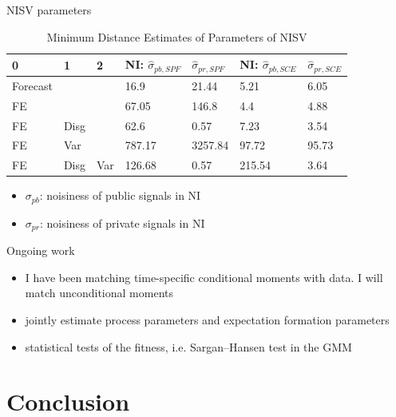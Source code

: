 \documentclass{beamer}
\begin{document}
\begin{frame}{NISV parameters}
	\begin{table}
		\centering
		\caption{Minimum Distance Estimates of Parameters of NISV}
		\label{GMM_Est_NI_SV_Table}
	\begin{tabular}{lllllll}
		\hline 
		0        & 1    & 2   & NI: $\hat\sigma_{pb,SPF}$ & $\hat\sigma_{pr,SPF}$ & NI: $\hat\sigma_{pb,SCE}$ & $\hat\sigma_{pr,SCE}$ \\
		\hline 
		Forecast &      &     & 16.9                      & 21.44                 & 5.21                      & 6.05                  \\
		FE       &      &     & 67.05                     & 146.8                 & 4.4                       & 4.88                  \\
		FE       & Disg &     & 62.6                      & 0.57                  & 7.23                      & 3.54                  \\
		FE       & Var  &     & 787.17                    & 3257.84               & 97.72                     & 95.73                 \\
		FE       & Disg & Var & 126.68                    & 0.57                  & 215.54                    & 3.64                 \\
		\hline 
	\end{tabular}
	\end{table}	
\begin{itemize}
	\item $\sigma_{pb}$: noisiness of public signals in NI
	\item $\sigma_{pr}$: noisiness of private signals in NI 
\end{itemize}
\end{frame}


\begin{frame}{Ongoing work}
	\begin{itemize}
		\item I have been matching time-specific conditional moments with data. I will match unconditional moments
		\item jointly estimate process parameters and expectation formation parameters
		\item statistical tests of the fitness,  i.e. Sargan–Hansen test in the GMM
	\end{itemize}	
\end{frame}

\section{Conclusion}
\end{document}
